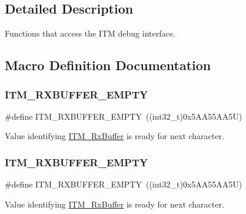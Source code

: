 \subsection{Detailed Description}
Functions that access the I\+TM debug interface. 



\subsection{Macro Definition Documentation}
\mbox{\label{group___c_m_s_i_s__core___debug_functions_gaa822cb398ee022b59e9e6c5d7bbb228a}} 
\subsubsection{\texorpdfstring{ITM\_RXBUFFER\_EMPTY}{ITM\_RXBUFFER\_EMPTY}\hspace{0.1cm}{\footnotesize\ttfamily [1/6]}}
{\footnotesize\ttfamily \#define I\+T\+M\+\_\+\+R\+X\+B\+U\+F\+F\+E\+R\+\_\+\+E\+M\+P\+TY~((int32\+\_\+t)0x5\+A\+A55\+A\+A5\+U)}

Value identifying \mbox{\hyperlink{group___c_m_s_i_s__core___debug_functions_ga12e68e55a7badc271b948d6c7230b2a8}{I\+T\+M\+\_\+\+Rx\+Buffer}} is ready for next character. \mbox{\label{group___c_m_s_i_s__core___debug_functions_gaa822cb398ee022b59e9e6c5d7bbb228a}} 
\subsubsection{\texorpdfstring{ITM\_RXBUFFER\_EMPTY}{ITM\_RXBUFFER\_EMPTY}\hspace{0.1cm}{\footnotesize\ttfamily [2/6]}}
{\footnotesize\ttfamily \#define I\+T\+M\+\_\+\+R\+X\+B\+U\+F\+F\+E\+R\+\_\+\+E\+M\+P\+TY~((int32\+\_\+t)0x5\+A\+A55\+A\+A5\+U)}

Value identifying \mbox{\hyperlink{group___c_m_s_i_s__core___debug_functions_ga12e68e55a7badc271b948d6c7230b2a8}{I\+T\+M\+\_\+\+Rx\+Buffer}} is ready for next character. \mbox{\label{group___c_m_s_i_s__core___debug_functions_gaa822cb398ee022b59e9e6c5d7bbb228a}} 

